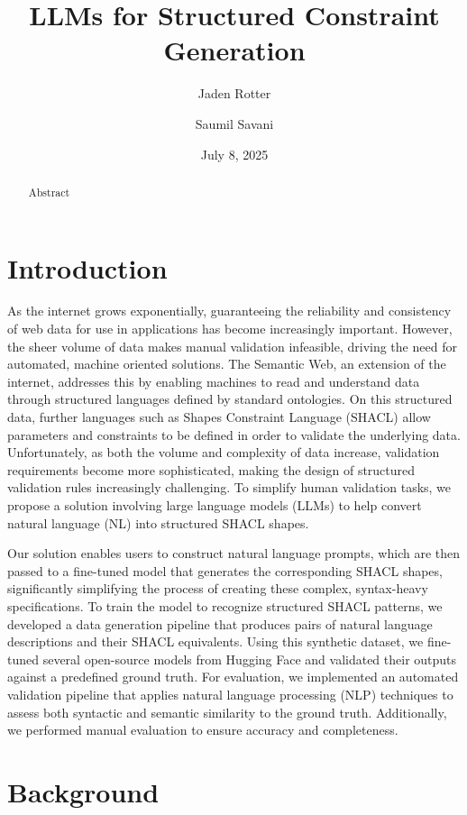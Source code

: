 \documentclass[
  english,        %
  font=times,     %
  twocolumn,      %
]{tumarticle}
\title{LLMs for Structured Constraint Generation}
\author[email=jaden.rotter@tum.de]{Jaden Rotter}
\author[email=ssavani600@tum.de]{Saumil Savani}
\date{July 8, 2025}
\begin{document}
\maketitle

\begin{abstract}
Abstract
\end{abstract}

\section{Introduction}
As the internet grows exponentially, guaranteeing the reliability and consistency of web data for use in applications has become increasingly important. 
However, the sheer volume of data makes manual validation infeasible, driving the need for automated, machine oriented solutions. 
The Semantic Web, an extension of the internet, addresses this by enabling machines to read and understand data through structured languages defined by standard ontologies. 
On this structured data, further languages such as Shapes Constraint Language (SHACL) allow parameters and constraints to be defined in order to validate the underlying data. 
Unfortunately, as both the volume and complexity of data increase, validation requirements become more sophisticated, making the design of structured validation rules increasingly challenging.
To simplify human validation tasks, we propose a solution involving large language models (LLMs) to help convert natural language (NL) into structured SHACL shapes. 

Our solution enables users to construct natural language prompts, which are then passed to a fine-tuned model that generates the corresponding SHACL shapes, significantly simplifying the process of creating these complex, syntax-heavy specifications. 
To train the model to recognize structured SHACL patterns, we developed a data generation pipeline that produces pairs of natural language descriptions and their SHACL equivalents. 
Using this synthetic dataset, we fine-tuned several open-source models from Hugging Face and validated their outputs against a predefined ground truth.
For evaluation, we implemented an automated validation pipeline that applies natural language processing (NLP) techniques to assess both syntactic and semantic similarity to the ground truth. 
Additionally, we performed manual evaluation to ensure accuracy and completeness.


\section{Background}
\end{document}
